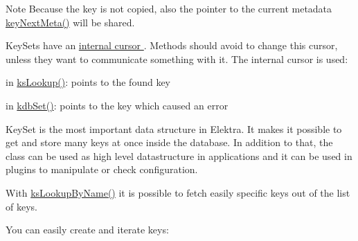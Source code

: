 \begin{DoxyNote}{Note}
Because the key is not copied, also the pointer to the current metadata \hyperlink{group__keymeta_ga4c88342f580a4291455a801af71ce048}{key\+Next\+Meta()} will be shared.
\end{DoxyNote}
Key\+Sets have an \hyperlink{group__keyset_ga4287b9416912c5f2ab9c195cb74fb094}{internal cursor }. Methods should avoid to change this cursor, unless they want to communicate something with it. The internal cursor is used\+:


\begin{DoxyItemize}
\item in \hyperlink{group__keyset_gaa34fc43a081e6b01e4120daa6c112004}{ks\+Lookup()}\+: points to the found key
\item in \hyperlink{group__kdb_ga11436b058408f83d303ca5e996832bcf}{kdb\+Set()}\+: points to the key which caused an error
\end{DoxyItemize}

Key\+Set is the most important data structure in Elektra. It makes it possible to get and store many keys at once inside the database. In addition to that, the class can be used as high level datastructure in applications and it can be used in plugins to manipulate or check configuration.

With \hyperlink{group__keyset_gad2e30fb6d4739d917c5abb2ac2f9c1a1}{ks\+Lookup\+By\+Name()} it is possible to fetch easily specific keys out of the list of keys.

You can easily create and iterate keys\+:




